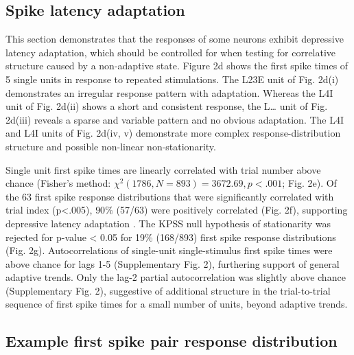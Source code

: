 \documentclass{article}
\begin{document}
\subsection*{Spike latency adaptation}


This section demonstrates that the responses of some neurons exhibit depressive latency adaptation, which should be controlled for when testing for correlative structure caused by a non-adaptive state. Figure 2d shows the first spike times of 5 single units in response to repeated stimulations. The L23E unit of Fig. 2d(i) demonstrates an irregular response pattern with adaptation. Whereas the L4I unit of Fig. 2d(ii) shows a short and consistent response, the L… unit of Fig. 2d(iii) reveals a sparse and variable pattern and no obvious adaptation. The L4I and L4I units of Fig. 2d(iv, v) demonstrate more complex response-distribution structure and possible non-linear non-stationarity. 

Single unit first spike times are linearly correlated with trial number above chance (Fisher's method: $\chi^{2} (1786, N = 893) = 3672.69, p<.001$; Fig. 2e).
Of the 63 first spike response distributions that were significantly correlated with trial index (p<.005), $90\%$ (57/63) were positively correlated (Fig. 2f), supporting depressive latency adaptation \cite{ahissar2000transformation, ahissar2001temporal, kheradpezhouh2017response}. The KPSS null hypothesis of stationarity was rejected for p-value < 0.05 for 19\% (168/893) first spike response distributions (Fig. 2g). Autocorrelations of single-unit single-stimulus first spike times were above chance for lags 1-5 (Supplementary Fig. 2), furthering support of general adaptive trends. Only the lag-2 partial autocorrelation was slightly above chance (Supplementary Fig. 2), suggestive of additional structure in the trial-to-trial sequence of first spike times for a small number of units, beyond adaptive trends.


\subsection*{Example first spike pair response distribution}
\end{document}
